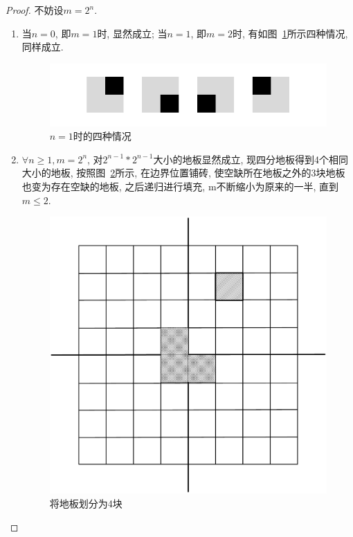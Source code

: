 \documentclass[a4paper]{ctexart}
\begin{document}
\begin{sloppypar}
    \begin{proof}
        不妨设$m = 2^n$.
        \begin{enumerate}[1)]
            \item 当$n = 0$, 即$m = 1$时, 显然成立;
                  当$n = 1$, 即$m = 2$时, 有如图~\ref{4Cases}所示四种情况, 同样成立.
                  \begin{figure}[h]
                      \centering
                      \includegraphics[scale=0.5]{images/4Cases.png}
                      \caption{$n = 1$时的四种情况}
                      \label{4Cases}
                  \end{figure}
            \item $\forall n \geq 1, m = 2^n$,
                  对$2^{n-1} * 2^{n-1}$大小的地板显然成立,
                  现四分地板得到4个相同大小的地板,
                  按照图~\ref{split}所示, 在边界位置铺砖,
                  使空缺所在地板之外的3块地板也变为存在空缺的地板,
                  之后递归进行填充, m不断缩小为原来的一半,
                  直到$m \leq 2$.
                  \qedhere  %
                  \begin{figure}[h]
                      \centering
                      \includegraphics[scale=0.4]{images/split.png}
                      \caption{将地板划分为4块}
                      \label{split}
                  \end{figure}
        \end{enumerate}
    \end{proof}
    \vspace{1em}


\end{sloppypar}
\end{document}
